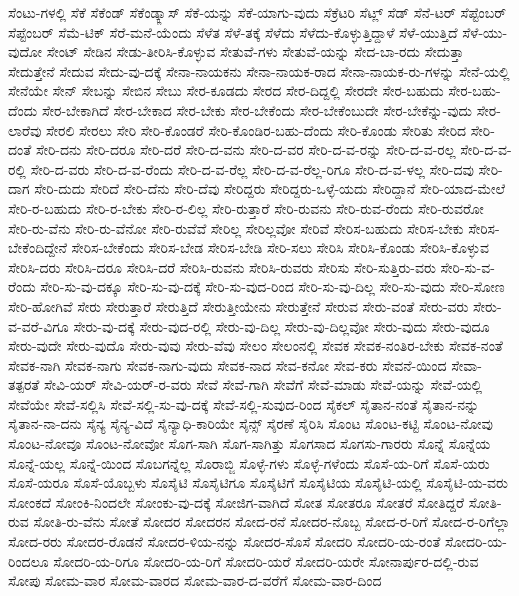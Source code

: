{ಸೆಂಟು-ಗಳಲ್ಲಿ
ಸೆಕೆ
ಸೆಕೆಂಡ್
ಸೆಕೆಂಡ್ಕ್ಲಾಸ್
ಸೆಕೆ-ಯನ್ನು
ಸೆಕೆ-ಯಾಗು-ವುದು
ಸೆಕ್ರೆಟರಿ
ಸೆಟ್ಲ್
ಸೆಡ್
ಸೆನೆ-ಟರ್
ಸೆಪ್ಟೆಂಬರ್
ಸೆಪ್ಟೆಂಬರ್
ಸೆಮೆ-ಟಿಕ್
ಸೆರೆ-ಮನೆ-ಯೆಂದು
ಸೆಳೆತ
ಸೆಳೆ-ತಕ್ಕೆ
ಸೆಳೆದು
ಸೆಳೆದು-ಕೊಳ್ಳುತ್ತಿದ್ದಾಳೆ
ಸೆಳೆ-ಯುತ್ತಿದೆ
ಸೆಳೆ-ಯು-ವುದೋ
ಸೇಂಟ್
ಸೇಡಿನ
ಸೇಡು-ತೀರಿಸಿ-ಕೊಳ್ಳುವ
ಸೇತುವೆ-ಗಳು
ಸೇತುವೆ-ಯನ್ನು
ಸೇದ-ಬಾ-ರದು
ಸೇದುತ್ತಾ
ಸೇದುತ್ತೇನೆ
ಸೇದುವ
ಸೇದು-ವು-ದಕ್ಕೆ
ಸೇನಾ-ನಾಯಕನು
ಸೇನಾ-ನಾಯಕ-ರಾದ
ಸೇನಾ-ನಾಯಕ-ರು-ಗಳನ್ನು
ಸೇನೆ-ಯಲ್ಲಿ
ಸೇನೆಯೇ
ಸೇನ್
ಸೇಬನ್ನು
ಸೇಬಿನ
ಸೇಬು
ಸೇರ-ಕೂಡದು
ಸೇರದ
ಸೇರ-ದಿದ್ದಲ್ಲಿ
ಸೇರದೇ
ಸೇರ-ಬಹುದು
ಸೇರ-ಬಹು-ದೆಂದು
ಸೇರ-ಬೇಕಾಗಿದೆ
ಸೇರ-ಬೇಕಾದ
ಸೇರ-ಬೇಕು
ಸೇರ-ಬೇಕೆಂದು
ಸೇರ-ಬೇಕೆಂಬುದೇ
ಸೇರ-ಬೇಕೆನ್ನು-ವುದು
ಸೇರ-ಲಾರೆವು
ಸೇರಲಿ
ಸೇರಲು
ಸೇರಿ
ಸೇರಿ-ಕೊಂಡರೆ
ಸೇರಿ-ಕೊಂಡಿರ-ಬಹು-ದೆಂದು
ಸೇರಿ-ಕೊಂಡು
ಸೇರಿತು
ಸೇರಿದ
ಸೇರಿ-ದಂತೆ
ಸೇರಿ-ದನು
ಸೇರಿ-ದರೂ
ಸೇರಿ-ದರೆ
ಸೇರಿ-ದ-ವನು
ಸೇರಿ-ದ-ವರ
ಸೇರಿ-ದ-ವ-ರನ್ನು
ಸೇರಿ-ದ-ವ-ರಲ್ಲ
ಸೇರಿ-ದ-ವ-ರಲ್ಲಿ
ಸೇರಿ-ದ-ವರು
ಸೇರಿ-ದ-ವ-ರೆಂದು
ಸೇರಿ-ದ-ವ-ರೆಲ್ಲ
ಸೇರಿ-ದ-ವ-ರೆಲ್ಲ-ರಿಗೂ
ಸೇರಿ-ದ-ವ-ಳಲ್ಲ
ಸೇರಿ-ದವು
ಸೇರಿ-ದಾಗ
ಸೇರಿ-ದುದು
ಸೇರಿದೆ
ಸೇರಿ-ದೆನು
ಸೇರಿ-ದೆವು
ಸೇರಿದ್ದರು
ಸೇರಿದ್ದರು-ಒಳ್ಳೆ-ಯದು
ಸೇರಿದ್ದಾನೆ
ಸೇರಿ-ಯಾದ-ಮೇಲೆ
ಸೇರಿ-ರ-ಬಹುದು
ಸೇರಿ-ರ-ಬೇಕು
ಸೇರಿ-ರ-ಲಿಲ್ಲ
ಸೇರಿ-ರುತ್ತಾರೆ
ಸೇರಿ-ರುವನು
ಸೇರಿ-ರುವ-ರೆಂದು
ಸೇರಿ-ರುವರೋ
ಸೇರಿ-ರು-ವೆನು
ಸೇರಿ-ರು-ವೆನೋ
ಸೇರಿ-ರುವೆವೆ
ಸೇರಿಲ್ಲ
ಸೇರಿಲ್ಲವೋ
ಸೇರಿವೆ
ಸೇರಿಸ-ಬಹುದು
ಸೇರಿಸ-ಬೇಕು
ಸೇರಿಸ-ಬೇಕೆಂದಿದ್ದೇನೆ
ಸೇರಿಸ-ಬೇಕೆಂದು
ಸೇರಿಸ-ಬೇಡ
ಸೇರಿಸ-ಬೇಡಿ
ಸೇರಿ-ಸಲು
ಸೇರಿಸಿ
ಸೇರಿಸಿ-ಕೊಂಡು
ಸೇರಿಸಿ-ಕೊಳ್ಳುವ
ಸೇರಿಸಿ-ದರು
ಸೇರಿಸಿ-ದರೂ
ಸೇರಿಸಿ-ದರೆ
ಸೇರಿಸಿ-ರುವನು
ಸೇರಿಸಿ-ರುವರು
ಸೇರಿಸು
ಸೇರಿ-ಸುತ್ತಿರು-ವರು
ಸೇರಿ-ಸು-ವ-ರೆಂದು
ಸೇರಿ-ಸು-ವು-ದಕ್ಕೂ
ಸೇರಿ-ಸು-ವು-ದಕ್ಕೆ
ಸೇರಿ-ಸು-ವುದ-ರಿಂದ
ಸೇರಿ-ಸು-ವು-ದಿಲ್ಲ
ಸೇರಿ-ಸು-ವುದು
ಸೇರಿ-ಸೋಣ
ಸೇರಿ-ಹೋಗಿವೆ
ಸೇರು
ಸೇರುತ್ತಾರೆ
ಸೇರುತ್ತಿದೆ
ಸೇರುತ್ತೀಯೇನು
ಸೇರುತ್ತೇನೆ
ಸೇರುವ
ಸೇರು-ವಂತೆ
ಸೇರು-ವರು
ಸೇರು-ವ-ವರೆ-ವಿಗೂ
ಸೇರು-ವು-ದಕ್ಕೆ
ಸೇರು-ವುದ-ರಲ್ಲಿ
ಸೇರು-ವು-ದಿಲ್ಲ
ಸೇರು-ವು-ದಿಲ್ಲವೋ
ಸೇರು-ವುದು
ಸೇರು-ವುದೂ
ಸೇರು-ವುದೇ
ಸೇರು-ವುದೊ
ಸೇರು-ವುವು
ಸೇರು-ವೆವು
ಸೇಲಂ
ಸೇಲಂನಲ್ಲಿ
ಸೇವಕ
ಸೇವಕ-ನಂತಿರ-ಬೇಕು
ಸೇವಕ-ನಂತೆ
ಸೇವಕ-ನಾಗಿ
ಸೇವಕ-ನಾಗು
ಸೇವಕ-ನಾಗು-ವುದು
ಸೇವಕ-ನಾದ
ಸೇವ-ಕನೋ
ಸೇವ-ಕರು
ಸೇವನೆ-ಯಿಂದ
ಸೇವಾ-ತತ್ಪರತೆ
ಸೇವಿ-ಯರ್
ಸೇವಿ-ಯರ್-ರ-ವರು
ಸೇವೆ
ಸೇವೆ-ಗಾಗಿ
ಸೇವೆಗೆ
ಸೇವೆ-ಮಾಡು
ಸೇವೆ-ಯನ್ನು
ಸೇವೆ-ಯಲ್ಲಿ
ಸೇವೆಯೇ
ಸೇವೆ-ಸಲ್ಲಿಸಿ
ಸೇವೆ-ಸಲ್ಲಿ-ಸು-ವು-ದಕ್ಕೆ
ಸೇವೆ-ಸಲ್ಲಿ-ಸುವುದ-ರಿಂದ
ಸೈಕಲ್
ಸೈತಾನ-ನಂತೆ
ಸೈತಾನ-ನನ್ನು
ಸೈತಾನ-ನಾ-ದನು
ಸೈನ್ಯ
ಸೈನ್ಯ-ವಿದೆ
ಸೈನ್ಯಾಧಿ-ಕಾರಿಯೇ
ಸೈನ್ಸ್
ಸೈರಣೆ
ಸೈರಿಸಿ
ಸೊಂಟ
ಸೊಂಟ-ಕಟ್ಟಿ
ಸೊಂಟ-ನೋವು
ಸೊಂಟ-ನೋವೂ
ಸೊಂಟ-ನೋವೋ
ಸೊಗ-ಸಾಗಿ
ಸೊಗ-ಸಾಗಿತ್ತು
ಸೊಗಸಾದ
ಸೊಗಸು-ಗಾರರು
ಸೊನ್ನೆ
ಸೊನ್ನೆಯ
ಸೊನ್ನೆ-ಯಲ್ಲ
ಸೊನ್ನೆ-ಯಿಂದ
ಸೊಬಗನ್ನೆಲ್ಲ
ಸೊರಾಬ್ಜಿ
ಸೊಳ್ಳೆ-ಗಳು
ಸೊಳ್ಳೆ-ಗಳೆಂದು
ಸೊಸೆ-ಯ-ರಿಗೆ
ಸೊಸೆ-ಯರು
ಸೊಸೆ-ಯರೂ
ಸೊಸೆ-ಯೊಬ್ಬಳು
ಸೊಸೈಟಿ
ಸೊಸೈಟಿಗೂ
ಸೊಸೈಟಿಗೆ
ಸೊಸೈಟಿಯ
ಸೊಸೈಟಿ-ಯಲ್ಲಿ
ಸೊಸೈಟಿ-ಯ-ವರು
ಸೋಂಕದೆ
ಸೋಂಕಿ-ನಿಂದಲೇ
ಸೋಂಕು-ವು-ದಕ್ಕೆ
ಸೋಜಿಗ-ವಾಗಿದೆ
ಸೋತ
ಸೋತರೂ
ಸೋತರೆ
ಸೋತಿದ್ದರೆ
ಸೋತಿ-ರುವ
ಸೋತಿ-ರು-ವೆನು
ಸೋತೆ
ಸೋದರ
ಸೋದರನ
ಸೋದ-ರನೆ
ಸೋದರ-ನೊಬ್ಬ
ಸೋದ-ರ-ರಿಗೆ
ಸೋದ-ರ-ರಿಗೆಲ್ಲಾ
ಸೋದ-ರರು
ಸೋದರ-ರೊಡನೆ
ಸೋದರ-ಳಿಯ-ನನ್ನು
ಸೋದರ-ಸೊಸೆ
ಸೋದರಿ
ಸೋದರಿ-ಯ-ರಂತೆ
ಸೋದರಿ-ಯ-ರಿಂದಲೂ
ಸೋದರಿ-ಯ-ರಿಗೂ
ಸೋದರಿ-ಯ-ರಿಗೆ
ಸೋದರಿ-ಯರೆ
ಸೋದರಿ-ಯರೇ
ಸೋನಾರ್ಪುರ-ದಲ್ಲಿ-ರುವ
ಸೋಪು
ಸೋಮ-ವಾರ
ಸೋಮ-ವಾರದ
ಸೋಮ-ವಾರ-ದ-ವರೆಗೆ
ಸೋಮ-ವಾರ-ದಿಂದ
}
